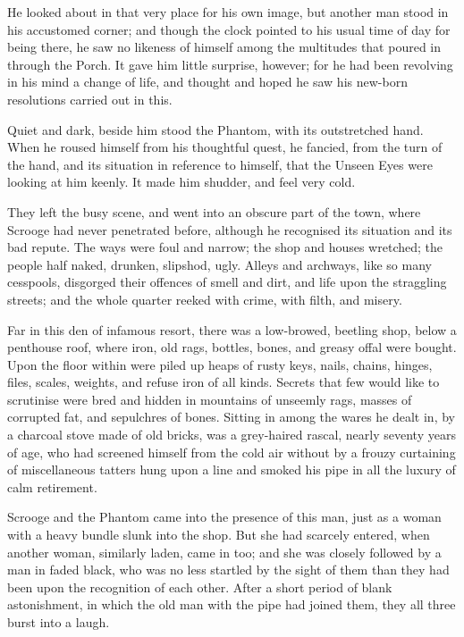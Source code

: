 He looked about in that very place for his own image, but another man
stood in his accustomed corner; and though the clock pointed to his
usual time of day for being there, he saw no likeness of himself among
the multitudes that poured in through the Porch. It gave him little
surprise, however; for he had been revolving in his mind a change of
life, and thought and hoped he saw his new-born resolutions carried out
in this.

Quiet and dark, beside him stood the Phantom, with its outstretched
hand. When he roused himself from his thoughtful quest, he fancied,
from the turn of the hand, and its situation in reference to himself,
that the Unseen Eyes were looking at him keenly. It made him shudder,
and feel very cold.

They left the busy scene, and went into an obscure part of the town,
where Scrooge had never penetrated before, although he recognised its
situation and its bad repute. The ways were foul and narrow; the shop
and houses wretched; the people half naked, drunken, slipshod, ugly.
Alleys and archways, like so many cesspools, disgorged their offences of
smell and dirt, and life upon the straggling streets; and the whole
quarter reeked with crime, with filth, and misery.

Far in this den of infamous resort, there was a low-browed, beetling
shop, below a penthouse roof, where iron, old rags, bottles, bones, and
greasy offal were bought. Upon the floor within were piled up heaps of
rusty keys, nails, chains, hinges, files, scales, weights, and refuse
iron of all kinds. Secrets that few would like to scrutinise were bred
and hidden in mountains of unseemly rags, masses of corrupted fat, and
sepulchres of bones. Sitting in among the wares he dealt in, by a
charcoal stove made of old bricks, was a grey-haired rascal, nearly
seventy years of age, who had screened himself from the cold air without
by a frouzy curtaining of miscellaneous tatters hung upon a line and
smoked his pipe in all the luxury of calm retirement.

Scrooge and the Phantom came into the presence of this man, just as a
woman with a heavy bundle slunk into the shop. But she had scarcely
entered, when another woman, similarly laden, came in too; and she was
closely followed by a man in faded black, who was no less startled by
the sight of them than they had been upon the recognition of each other.
After a short period of blank astonishment, in which the old man with
the pipe had joined them, they all three burst into a laugh.

